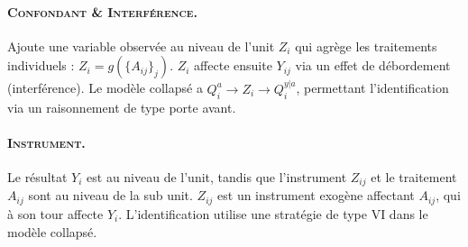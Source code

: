 \documentclass[11pt,a4paper]{article}
\begin{document}
\paragraph{\textsc{Confondant \& Interférence}.}
Ajoute une variable observée au niveau de l'unit $Z_i$ qui agrège les traitements individuels : $Z_i = g(\{A_{ij}\}_j)$.
$Z_i$ affecte ensuite $Y_{ij}$ via un effet de débordement (interférence).
Le modèle collapsé a $Q^a_i \to Z_i \to Q^{y|a}_i$, permettant l'identification via un raisonnement de type porte avant.

\paragraph{\textsc{Instrument}.}
Le résultat $Y_i$ est au niveau de l'unit, tandis que l'instrument $Z_{ij}$ et le traitement $A_{ij}$ sont au niveau de la sub unit.
$Z_{ij}$ est un instrument exogène affectant $A_{ij}$, qui à son tour affecte $Y_i$.
L'identification utilise une stratégie de type VI dans le modèle collapsé.
\end{document}
